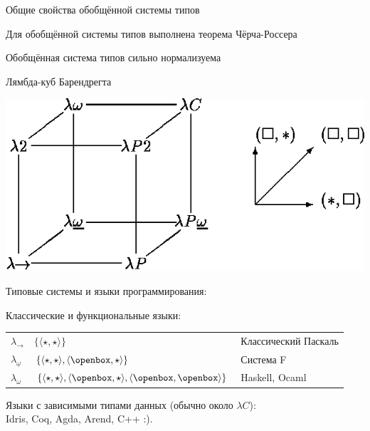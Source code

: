 \documentclass[aspectratio=169]{beamer}
\begin{document}
\begin{frame}{Общие свойства обобщённой системы типов}
\begin{thm}Для обобщённой системы типов выполнена теорема Чёрча-Россера\end{thm}
\begin{thm}Обобщённая система типов сильно нормализуема\end{thm}
\end{frame}

\begin{frame}{Лямбда-куб Барендрегта}
\begin{center}
    {\includegraphics[scale=0.3]{lection-05-cube.png}}
\end{center}
Типовые системы и языки программирования:

Классические и функциональные языки:
\begin{tabular}{lll}
$\lambda_\rightarrow$ & $\{\langle \star,\star \rangle\}$ & Классический Паскаль\\
$\lambda_{\underline{\omega}}$&$\{\langle \star,\star \rangle, \langle \openbox,\star\rangle\}$ & Система F\\
$\lambda_\omega$&$\{\langle \star,\star \rangle, \langle \openbox,\star\rangle, \langle \openbox,\openbox\rangle\}$ & Haskell, Ocaml
\end{tabular}

\vspace{0.3cm}
Языки с зависимыми типами данных (обычно около $\lambda C$):\\
Idris, Coq, Agda, Arend, C++ :).
\end{frame}
\end{document}

